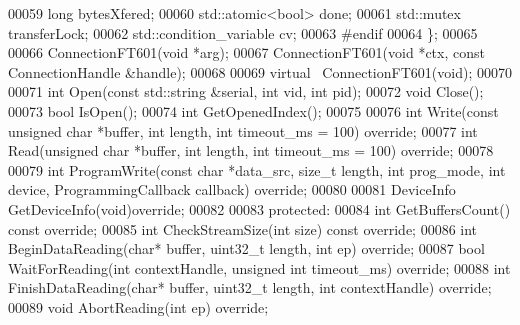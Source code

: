 \begin{DoxyCode}
00059         \textcolor{keywordtype}{long} bytesXfered;
00060         std::atomic<bool> done;
00061         std::mutex transferLock;
00062         std::condition\_variable cv;
00063 \textcolor{preprocessor}{#endif}
00064     \};
00065 
00066     ConnectionFT601(\textcolor{keywordtype}{void} *arg);
00067     ConnectionFT601(\textcolor{keywordtype}{void} *ctx, \textcolor{keyword}{const} ConnectionHandle &handle);
00068 
00069     \textcolor{keyword}{virtual} ~ConnectionFT601(\textcolor{keywordtype}{void});
00070 
00071     \textcolor{keywordtype}{int} Open(\textcolor{keyword}{const} std::string &serial, \textcolor{keywordtype}{int} vid, \textcolor{keywordtype}{int} pid);
00072     \textcolor{keywordtype}{void} Close();
00073     \textcolor{keywordtype}{bool} IsOpen();
00074     \textcolor{keywordtype}{int} GetOpenedIndex();
00075 
00076     \textcolor{keywordtype}{int} Write(\textcolor{keyword}{const} \textcolor{keywordtype}{unsigned} \textcolor{keywordtype}{char} *buffer, \textcolor{keywordtype}{int} length, \textcolor{keywordtype}{int} timeout_ms = 100) \textcolor{keyword}{override};
00077     \textcolor{keywordtype}{int} Read(\textcolor{keywordtype}{unsigned} \textcolor{keywordtype}{char} *buffer, \textcolor{keywordtype}{int} length, \textcolor{keywordtype}{int} timeout_ms = 100) \textcolor{keyword}{override};
00078 
00079     \textcolor{keywordtype}{int} ProgramWrite(\textcolor{keyword}{const} \textcolor{keywordtype}{char} *data\_src, \textcolor{keywordtype}{size\_t} length, \textcolor{keywordtype}{int} prog\_mode, \textcolor{keywordtype}{int} 
      device, ProgrammingCallback callback) \textcolor{keyword}{override};
00080     
00081     DeviceInfo GetDeviceInfo(\textcolor{keywordtype}{void})\textcolor{keyword}{override};
00082 
00083 \textcolor{keyword}{protected}:
00084     \textcolor{keywordtype}{int} GetBuffersCount() \textcolor{keyword}{const override};
00085     \textcolor{keywordtype}{int} CheckStreamSize(\textcolor{keywordtype}{int} size) \textcolor{keyword}{const override};
00086     \textcolor{keywordtype}{int} BeginDataReading(\textcolor{keywordtype}{char}* buffer, uint32\_t length, \textcolor{keywordtype}{int} ep) \textcolor{keyword}{override};
00087     \textcolor{keywordtype}{bool} WaitForReading(\textcolor{keywordtype}{int} contextHandle, \textcolor{keywordtype}{unsigned} \textcolor{keywordtype}{int} timeout_ms) \textcolor{keyword}{override};
00088     \textcolor{keywordtype}{int} FinishDataReading(\textcolor{keywordtype}{char}* buffer, uint32\_t length, \textcolor{keywordtype}{int} contextHandle) \textcolor{keyword}{override};
00089     \textcolor{keywordtype}{void} AbortReading(\textcolor{keywordtype}{int} ep) \textcolor{keyword}{override};

\end{DoxyCode}

